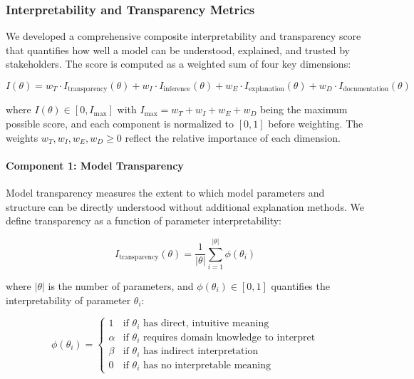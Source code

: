\documentclass[11pt,a4paper]{article}
\begin{document}
\subsubsection{Interpretability and Transparency Metrics}

We developed a comprehensive composite interpretability and transparency score that quantifies how well a model can be understood, explained, and trusted by stakeholders. The score is computed as a weighted sum of four key dimensions:

\begin{equation}
I(\theta) = w_T \cdot I_{\text{transparency}}(\theta) + w_I \cdot I_{\text{inference}}(\theta) + w_E \cdot I_{\text{explanation}}(\theta) + w_D \cdot I_{\text{documentation}}(\theta)
\label{eq:interpretability}
\end{equation}

where $I(\theta) \in [0, I_{\max}]$ with $I_{\max} = w_T + w_I + w_E + w_D$ being the maximum possible score, and each component is normalized to $[0, 1]$ before weighting. The weights $w_T, w_I, w_E, w_D \geq 0$ reflect the relative importance of each dimension.

\paragraph{Component 1: Model Transparency}

Model transparency measures the extent to which model parameters and structure can be directly understood without additional explanation methods. We define transparency as a function of parameter interpretability:

\begin{equation}
I_{\text{transparency}}(\theta) = \frac{1}{|\theta|} \sum_{i=1}^{|\theta|} \phi(\theta_i)
\label{eq:transparency}
\end{equation}

where $|\theta|$ is the number of parameters, and $\phi(\theta_i) \in [0, 1]$ quantifies the interpretability of parameter $\theta_i$:

\begin{equation}
\phi(\theta_i) = \begin{cases}
1 & \text{if } \theta_i \text{ has direct, intuitive meaning} \\
\alpha & \text{if } \theta_i \text{ requires domain knowledge to interpret} \\
\beta & \text{if } \theta_i \text{ has indirect interpretation} \\
0 & \text{if } \theta_i \text{ has no interpretable meaning}
\end{cases}
\end{equation}
\end{document}
